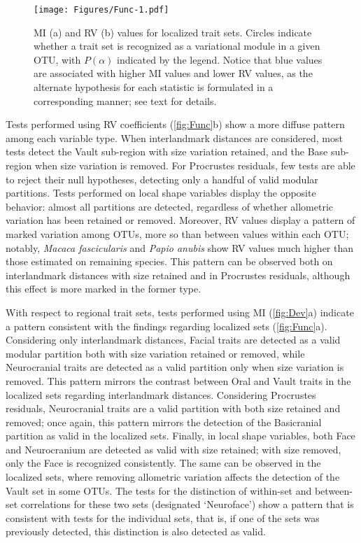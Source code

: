 \documentclass[12pt,]{article}
\begin{document}
\begin{figure}[htbp]
\centering
\texttt{[image: Figures/Func-1.pdf]}
\caption{MI (a) and RV (b) values for localized trait sets. Circles
indicate whether a trait set is recognized as a variational module in a
given OTU, with $P(\alpha)$ indicated by the legend. Notice that blue
values are associated with higher MI values and lower RV values, as the
alternate hypothesis for each statistic is formulated in a corresponding
manner; see text for details. \label{fig:Func}}
\end{figure}

Tests performed using RV coefficients (\autoref{fig:Func}b) show a more
diffuse pattern among each variable type. When interlandmark distances
are considered, most tests detect the Vault sub-region with size
variation retained, and the Base sub-region when size variation is
removed. For Procrustes residuals, few tests are able to reject their
null hypotheses, detecting only a handful of valid modular partitions.
Tests performed on local shape variables display the opposite behavior:
almost all partitions are detected, regardless of whether allometric
variation has been retained or removed. Moreover, RV values display a
pattern of marked variation among OTUs, more so than between values
within each OTU; notably, \emph{Macaca fascicularis} and \emph{Papio
anubis} show RV values much higher than those estimated on remaining
species. This pattern can be observed both on interlandmark distances
with size retained and in Procrustes residuals, although this effect is
more marked in the former type.

With respect to regional trait sets, tests performed using MI
(\autoref{fig:Dev}a) indicate a pattern consistent with the findings
regarding localized sets (\autoref{fig:Func}a). Considering only
interlandmark distances, Facial traits are detected as a valid modular
partition both with size variation retained or removed, while
Neurocranial traits are detected as a valid partition only when size
variation is removed. This pattern mirrors the contrast between Oral and
Vault traits in the localized sets regarding interlandmark distances.
Considering Procrustes residuals, Neurocranial traits are a valid
partition with both size retained and removed; once again, this pattern
mirrors the detection of the Basicranial partition as valid in the
localized sets. Finally, in local shape variables, both Face and
Neurocranium are detected as valid with size retained; with size
removed, only the Face is recognized consistently. The same can be
observed in the localized sets, where removing allometric variation
affects the detection of the Vault set in some OTUs. The tests for the
distinction of within-set and between-set correlations for these two
sets (designated `Neuroface') show a pattern that is consistent with
tests for the individual sets, that is, if one of the sets was
previously detected, this distinction is also detected as valid.
\end{document}

